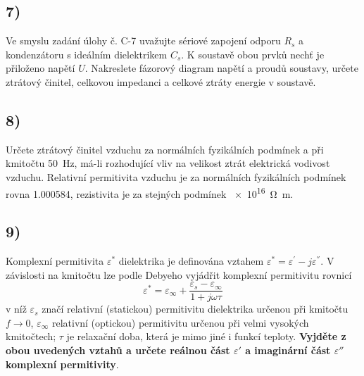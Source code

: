 \newpage


\subsection*{7)}
Ve smyslu zadání úlohy č. C-7 uvažujte sériové zapojení odporu $R_s$ a kondenzátoru s ideálním dielektrikem $C_s$. K soustavě obou prvků nechť je přiloženo napětí $U$. Nakreslete fázorový diagram napětí a proudů soustavy, určete ztrátový činitel, celkovou impedanci a celkové ztráty energie v soustavě.

\newpage


\subsection*{8)}
Určete ztrátový činitel vzduchu za normálních fyzikálních podmínek a při kmitočtu \SI{50}{\hertz}, má-li rozhodující vliv na velikost ztrát elektrická vodivost vzduchu. Relativní permitivita vzduchu je za normálních fyzikálních podmínek rovna \SI{1,000584}{}, rezistivita je za stejných podmínek \SI{e16}{\ohm\meter}.

\newpage


\subsection*{9)}
Komplexní permitivita $\varepsilon^*$ dielektrika je definována vztahem ${\varepsilon^{*}}={\varepsilon^{'}}-{j\varepsilon^{''}}$. V závislosti na kmitočtu lze podle Debyeho vyjádřit komplexní permitivitu rovnicí
\begin{equation}
    {\varepsilon^{*}}={\varepsilon_\infty}+\frac{{\varepsilon_s}-{\varepsilon_\infty}}{1+j\omega\tau}
\end{equation}
v níž $\varepsilon_s$ značí relativní (statickou) permitivitu dielektrika určenou při kmitočtu $f\rightarrow 0$, $\varepsilon_\infty$ relativní (optickou) permitivitu určenou při velmi vysokých kmitočtech; $\tau$ je relaxační doba, která je mimo jiné i funkcí teploty. \textbf{Vyjděte z obou uvedených vztahů
a určete reálnou část $\varepsilon{'}$ a imaginární část $\varepsilon{''}$ komplexní permitivity}.



